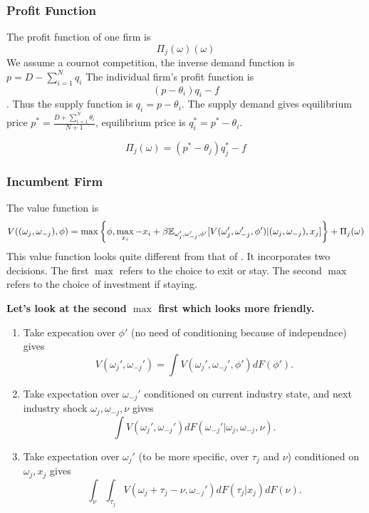 \documentclass[12pt]{article}[margin=1in]
\begin{document}
\subsubsection{Profit Function}
The profit function of one firm is
\begin{equation*}
    \Pi_j(\omega)(\omega)
\end{equation*}
We assume a cournot competition, the inverse demand function is 
$p = D-\sum_{i=1}^N q_i$
The individual firm's profit function is $$ (p-\theta_i)q_i-f$$. Thus the supply function is $q_i=p-\theta_i$. The supply demand gives equilibrium price $p^*=\frac{D+\sum_{i=1}^N \theta_i}{N+1}$, equilibrium price is $q_i^*=p^*-\theta_i$.

\begin{equation*}
    \Pi_j(\omega)=(p^*-\theta_j)q_j^*-f
\end{equation*}


\subsubsection{Incumbent Firm}
The value function is
\begin{equation*}
    \begin{split}
        V((\omega_j, \omega_{-j}),\phi) & = \max\left\{\phi,\max_{x_i}-x_i+\beta\mathbb{E}_{\omega_j',\omega_{-j}',\phi'}[V(\omega_j',\omega_{-j}',\phi')|(\omega_j, \omega_{-j}),x_j]\right\} + \Pi_j(\omega)\\
    \end{split}
\end{equation*}
 This value function looks quite different from that of \citet{rust1987optimal}. It incorporates two decisions. The first $\max$ refers to the choice to exit or stay. The second $\max$ refers to the choice of investment if staying.

\textbf{Let's look at the second $\max$ first which looks more friendly.}

\begin{enumerate}
    \item Take expecation over $\phi'$ (no need of conditioning because of independnce) gives $$V(\omega_j',\omega_{-j}')=\int V(\omega_j', \omega_{-j}', \phi')dF(\phi').$$
    \item Take expectation over $\omega_{-j}'$ conditioned on current industry state, and next industry shock $\omega_j,\omega_{-j},\nu$ gives $$\int V(\omega_j', \omega_{-j}')dF(\omega_{-j}'|\omega_j,\omega_{-j},\nu).$$
    \item Take expectation over $\omega_j'$ (to be more specific, over $\tau_j$ and $\nu$) conditioned on $\omega_j,x_j$ gives $$\int_\nu \int_{\tau_j} V(\omega_j+\tau_j-\nu, \omega_{-j}')dF(\tau_j|x_j)dF(\nu).$$
\end{enumerate}
\end{document}
